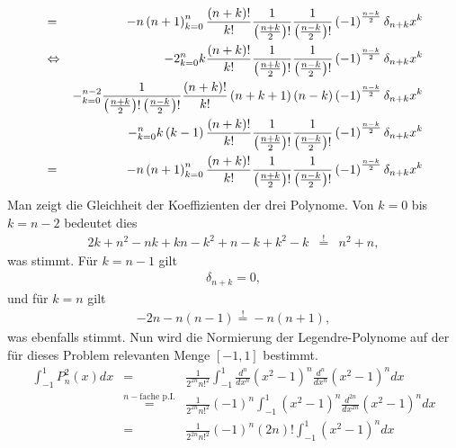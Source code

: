 \documentclass{book}
\newcommand{\hastobe}{\stackrel{!}{=}}
\let\sum\relax
\DeclareMathOperator*{\sum}{\raisebox{-3.5pt}{\scalebox{2}{\rotatebox{1}{{\bask Σ}}}}}
\begin{document}
\begin{eqnarray}
& = & -n\left(n + 1\right)\sum_{k = 0}^{n}\frac{\left(n + k\right)!}{k!}\frac{1}{\left(\frac{n + k}{2}\right)!}\frac{1}{\left(\frac{n - k}{2}\right)!}\left(-1\right)^{\frac{n - k}{2}}\delta_{n + k}x^k\nonumber\\
&\Leftrightarrow& -2\sum_{k = 0}^{n}k\frac{\left(n + k\right)!}{k!}\frac{1}{\left(\frac{n + k}{2}\right)!}\frac{1}{\left(\frac{n - k}{2}\right)!}\left(-1\right)^{\frac{n - k}{2}}\delta_{n + k}x^k\nonumber\\
&&- \sum_{k = 0}^{n - 2}\frac{1}{\left(\frac{n + k}{2}\right)!\left(\frac{n - k}{2}\right)!}\frac{\left(n + k\right)!}{k!}\left(n + k + 1\right)\left(n - k\right)\left(-1\right)^{\frac{n - k}{2}}\delta_{n + k}x^k\nonumber\\
&&- \sum_{k = 0}^{n}k\left(k - 1\right)\frac{\left(n + k\right)!}{k!}\frac{1}{\left(\frac{n + k}{2}\right)!}\frac{1}{\left(\frac{n - k}{2}\right)!}\left(-1\right)^{\frac{n - k}{2}}\delta_{n + k}x^k\nonumber\\
& = & -n\left(n + 1\right)\sum_{k = 0}^{n}\frac{\left(n + k\right)!}{k!}\frac{1}{\left(\frac{n + k}{2}\right)!}\frac{1}{\left(\frac{n - k}{2}\right)!}\left(-1\right)^{\frac{n - k}{2}}\delta_{n + k}x^k
\end{eqnarray}
%
Man zeigt die Gleichheit der Koeffizienten der drei Polynome. Von $k = 0$ bis $k = n - 2$ bedeutet dies
%
\begin{eqnarray}
2k + n^2 - nk + kn - k^2 + n - k + k^2 - k&\hastobe&n^2 + n, 
\end{eqnarray}
%
was stimmt. Für $k = n - 1$ gilt
%
\begin{eqnarray}
\delta_{n + k} = 0, 
\end{eqnarray}
%
und für $k = n$ gilt
%
\begin{eqnarray}
- 2n - n\left(n - 1\right)\hastobe - n\left(n + 1\right), 
\end{eqnarray}
%
was ebenfalls stimmt. Nun wird die Normierung der Legendre-Polynome auf der für dieses Problem relevanten Menge $\left[-1, 1\right]$ bestimmt.
%
\begin{eqnarray}
\int_{-1}^{1}P_n^2\left(x\right)dx & = & \frac{1}{2^{2n}n!^2}\int_{-1}^{1}\frac{d^n}{dx^n}\left(x^2 - 1\right)^n\frac{d^n}{dx^n}\left(x^2 - 1\right)^ndx\nonumber\\
&\stackrel{n-\text{fache p.I.}}{=}&\frac{1}{2^{2n}n!^2}\left(-1\right)^n\int_{-1}^{1}\left(x^2 - 1\right)^n\frac{d^{2n}}{dx^{2n}}\left(x^2 - 1\right)^ndx\nonumber\\
& = & \frac{1}{2^{2n}n!^2}\left(-1\right)^n\left(2n\right)!\int_{-1}^{1}\left(x^2 - 1\right)^ndx
\end{eqnarray}
\end{document}
